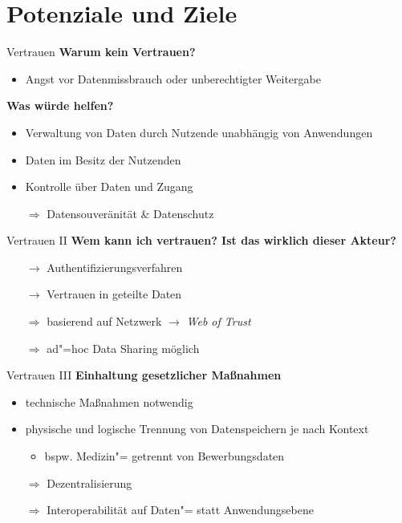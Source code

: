 
\section{Potenziale und Ziele}

\begin{frame}{Vertrauen}
    \textbf{Warum kein Vertrauen?}
    \begin{itemize}
        \item Angst vor Datenmissbrauch oder unberechtigter Weitergabe~\cite{mollerIndustrialDataEcosystems2024}
    \end{itemize}

    \pause
    \textbf{Was würde helfen?}
    \begin{itemize}
        \item Verwaltung von Daten durch Nutzende unabhängig von Anwendungen
        \item Daten im Besitz der Nutzenden
        \item Kontrolle über Daten und Zugang

        \pause
        \item[$\Rightarrow$] Datensouveränität \& Datenschutz
    \end{itemize}
\end{frame}

\begin{frame}{Vertrauen II}
    \textbf{Wem kann ich vertrauen? Ist das wirklich dieser Akteur?}
    \begin{itemize}
        \item[$\to$] Authentifizierungsverfahren
        \item[$\to$] Vertrauen in geteilte Daten

        \pause
        \item[$\Rightarrow$] basierend auf Netzwerk $\to$ \emph{Web of Trust}
        \item[$\Rightarrow$] ad"=hoc Data Sharing möglich
    \end{itemize}
\end{frame}

\begin{frame}{Vertrauen III}
    \textbf{Einhaltung gesetzlicher Maßnahmen}
    \begin{itemize}
        \item technische Maßnahmen notwendig

        \pause
        \item physische und logische Trennung von Datenspeichern je nach Kontext
        \begin{itemize}
            \item bspw. Medizin"= getrennt von Bewerbungsdaten
        \end{itemize}

        \pause
        \item[$\Rightarrow$] Dezentralisierung
        \item[$\Rightarrow$] Interoperabilität auf Daten"= statt Anwendungsebene
    \end{itemize}
\end{frame}


